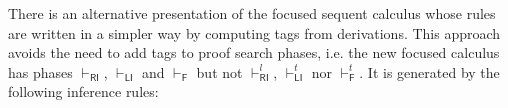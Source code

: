 \documentclass[submission,copyright,creativecommons]{eptcs}
\theoremstyle{definition}
\newcommand{\RI}{\mathsf{RI}}
\newcommand{\LI}{\mathsf{LI}}
\newcommand{\F}{\mathsf{F}}
\newcommand{\tP}{\mathbb{P}}
\newcommand{\tCone}{\mathbb{C}_1}
\newcommand{\tCtwo}{\mathbb{C}_2}
\newcommand{\tE}{\mathbb{R}}
\begin{document}
There is an alternative presentation of the focused sequent calculus whose rules are written in a simpler way by computing tags from derivations.
This approach avoids the need to add tags to proof search phases, i.e. the new focused calculus has phases $\vdash_\RI$, $\vdash_\LI$ and $\vdash_\F$ but not $\vdash^l_\RI$, $\vdash^t_\LI$ nor $\vdash^t_\F$.
It is generated by the following inference rules:
\end{document}
